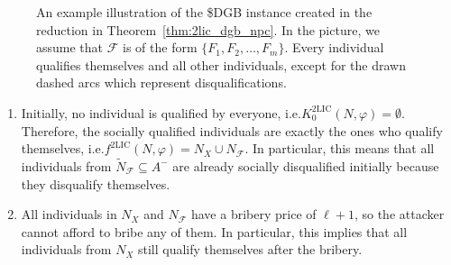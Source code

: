 \documentclass[
    12pt,               %
    a4paper,            %
    bibtotoc,           %
    pointlessnumbers,   %
    ngerman,            %
    titlepage,          %
    leqno,              %
    ]{scrarticle}       %
\newcommand\thmref{Theorem~\ref}
\begin{document}
\begin{Proof}
\begin{figure}[!tbh]
{
}
\caption{An example illustration of the \$DGB instance created in the reduction in \thmref{thm:2lic_dgb_npc}. In the picture, we assume that $\mathcal{F}$ is of the form $\{ F_1, F_2, \ldots, F_m \}$. Every individual qualifies themselves and all other individuals, except for the drawn dashed arcs which represent disqualifications.}
\label{fig:2lic_dgb_npc}
\end{figure}



\begin{enumerate}[
    topsep=-4pt,
    leftmargin=*,
    itemindent=4.96em,
    label={\textit{Fact \ref*{thm:2lic_dgb_npc}.\arabic*}:},
    ref={\ref*{thm:2lic_dgb_npc}.\arabic*}
]
\item \label{fact:2lic_dgb_initial_situation}
Initially, no individual is qualified by everyone, i.e.\@ $K^{\text{2LIC}}_0(N, \varphi) = \emptyset$. Therefore, the socially qualified individuals are exactly the ones who qualify themselves, i.e.\@ $f^{\text{2LIC}}(N, \varphi) = N_X \cup N_\mathcal{F}$. In particular, this means that all individuals from $\tilde{N}_\mathcal{F} \subseteq A^-$ are already socially disqualified initially because they disqualify themselves.

\item \label{fact:2lic_dgb_cannot_bribe_in_n_x_or_n_f}
All individuals in $N_X$ and $N_\mathcal{F}$ have a bribery price of $\ell + 1$, so the attacker cannot afford to bribe any of them. In particular, this implies that all individuals from $N_X$ still qualify themselves after the bribery.


\end{enumerate}
\end{Proof}
\end{document}
